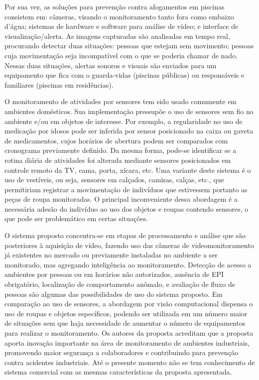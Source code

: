 Por sua vez, as soluções para prevenção contra afogamentos em piscinas consistem em: câmeras, visando o monitoramento tanto fora como embaixo d’água; sistemas de hardware e software para análise de vídeo; e interface de visualização/alerta. As imagens capturadas são analisadas em tempo real, procurando detectar duas situações: pessoas que estejam sem movimento; pessoas cuja movimentação seja incompatível com o que se poderia chamar de nado. Nessas duas situações, alertas sonoros e visuais são enviados para um equipamento que fica com o guarda-vidas (piscinas públicas) ou responsáveis e familiares (piscinas em residências).

O monitoramento de atividades por sensores tem sido usado comumente em ambientes domésticos. Sua implementação pressupõe o uso de sensores sem fio no ambiente e/ou em objetos de interesse. Por exemplo, a regularidade no uso de medicação por idosos pode ser inferida por sensor posicionado na caixa ou gaveta de medicamentos, cujos horários de abertura podem ser comparados com cronograma previamente definido. Da mesma forma, pode-se identificar se a rotina diária de atividades foi alterada mediante sensores posicionados em controle remoto da TV, cama, porta, xícara, etc. Uma variante deste sistema é o uso de vestíveis, ou seja, sensores em calçados, camisas, calças, etc., que permitiriam registrar a movimentação de indivíduos que estivessem portanto as peças de roupa monitoradas. O principal inconveniente dessa abordagem é a necessária adesão do indivíduo ao uso dos objetos e roupas contendo sensores, o que pode ser problemático em certas situações.

O sistema proposto concentra-se em etapas de processamento e análise que são posteriores à aquisição de vídeo, fazendo uso das câmeras de videomonitoramento já existentes no mercado ou previamente instaladas no ambiente a ser monitorado, mas agregando inteligência ao monitoramento. Detecção de acesso a ambientes por pessoas ou em horários não autorizados, ausência de EPI obrigatório, localização de comportamento anômalo, e avaliação de fluxo de pessoas são algumas das possibilidades de uso do sistema proposto. Em comparação ao uso de sensores, a abordagem por visão computacional dispensa o uso de roupas e objetos específicos, podendo ser utilizada em um número maior de situações sem que haja necessidade de aumentar o número de equipamentos para realizar o monitoramento. Os autores da proposta acreditam que a  proposta aporta inovação importante na área de  monitoramento de ambientes industriais, promovendo maior segurança a colaboradores e contribuindo para prevenção contra acidentes industriais. Até o presente momento não se tem conhecimento de sistema comercial com as mesmas características da proposta apresentada.

